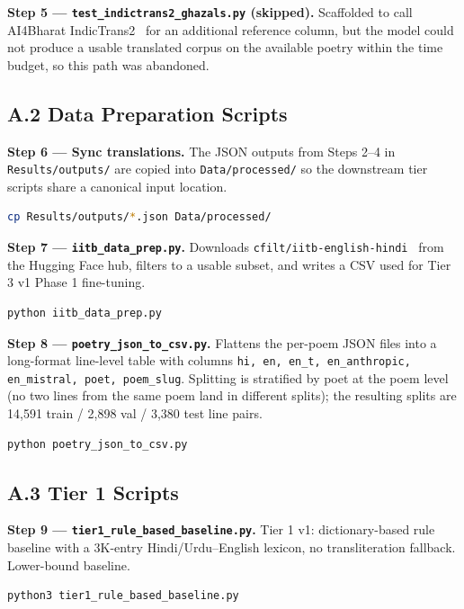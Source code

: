 \documentclass[11pt]{article}
\begin{document}
\textbf{Step 5 --- \texttt{test\_indictrans2\_ghazals.py} (skipped).} Scaffolded to call AI4Bharat IndicTrans2~\cite{indictrans2_repo,indictrans2_hf} for an additional reference column, but the model could not produce a usable translated corpus on the available poetry within the time budget, so this path was abandoned.

\subsection*{A.2 Data Preparation Scripts}

\textbf{Step 6 --- Sync translations.} The JSON outputs from Steps 2--4 in \texttt{Results/outputs/} are copied into \texttt{Data/processed/} so the downstream tier scripts share a canonical input location.
\begin{lstlisting}[language=bash]
cp Results/outputs/*.json Data/processed/
\end{lstlisting}

\textbf{Step 7 --- \texttt{iitb\_data\_prep.py}.} Downloads \texttt{cfilt/iitb-english-hindi}~\cite{cfilt_iitb} from the Hugging Face hub, filters to a usable subset, and writes a CSV used for Tier 3 v1 Phase 1 fine-tuning.
\begin{lstlisting}[language=bash]
python iitb_data_prep.py
\end{lstlisting}

\textbf{Step 8 --- \texttt{poetry\_json\_to\_csv.py}.} Flattens the per-poem JSON files into a long-format line-level table with columns \texttt{hi, en, en\_t, en\_anthropic, en\_mistral, poet, poem\_slug}. Splitting is stratified by poet at the poem level (no two lines from the same poem land in different splits); the resulting splits are 14{,}591 train / 2{,}898 val / 3{,}380 test line pairs.
\begin{lstlisting}[language=bash]
python poetry_json_to_csv.py
\end{lstlisting}

\subsection*{A.3 Tier 1 Scripts}

\textbf{Step 9 --- \texttt{tier1\_rule\_based\_baseline.py}.} Tier 1 v1: dictionary-based rule baseline with a 3K-entry Hindi/Urdu--English lexicon, no transliteration fallback. Lower-bound baseline.
\begin{lstlisting}[language=bash]
python3 tier1_rule_based_baseline.py
\end{lstlisting}
\end{document}
